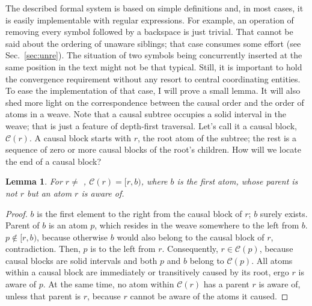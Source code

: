 \documentclass{sig-alternate}
\newtheorem{lemma}{Lemma}
\newcommand{\tighten}{\setlength{\itemsep}{1pt}\setlength{\parskip}{0pt}\setlength{\parsep}{0pt}}
\begin{document}
The described formal system is based on simple definitions and, in most cases, it is easily implementable with regular expressions.
For example, an operation of removing every symbol followed by a backspace is just trivial.
That cannot be said about the ordering of unaware siblings; that case consumes some effort (see Sec.~\ref{sec:unre}).
The situation of two symbols being concurrently inserted at the same position in the text might not be that typical.
Still, it is important to hold the convergence requirement without any resort to central coordinating entities. 
To ease the implementation of that case, I will prove a small lemma.
It will also shed more light on the correspondence between the causal order and the order of atoms in a weave. 
Note that a causal subtree occupies a solid interval in the weave; that is just a feature of depth-first traversal.
Let's call it a causal block, $\mathcal{C}(r)$.
A causal block starts with $r$, the root atom of the subtree; the rest is a sequence of zero or more causal blocks of the root's children.
How will we locate the end of a causal block?
\begin{lemma}\tighten For $r \ne$ \aum, $\mathcal{C}(r) = [r,b)$,
where $b$ is the first atom, whose parent is not $r$ but an atom
$r$ is aware of. \label{lemma:1}
\end{lemma} 
\begin{proof}\tighten
$b$ is the first element to the right from the causal
block of $r$; $b$ surely exists. Parent of $b$ is an atom $p$,
which resides in the weave somewhere to the left from $b$.
$p \notin [r,b)$, because otherwise $b$ would also belong
to the causal block of $r$, contradiction.
Then, $p$ is to the left from $r$. 
Consequently, $r \in \mathcal{C}(p)$, because
causal blocks are solid intervals and both $p$ and $b$
belong to $\mathcal{C}(p)$. All atoms within a causal block are
immediately or transitively caused by its root,
ergo $r$ is aware of $p$. At the same time, no atom
within $\mathcal{C}(r)$ has a parent $r$ is aware of, unless
that parent is $r$, because $r$ cannot be aware of the
atoms it caused.
\end{proof}

\end{document}
